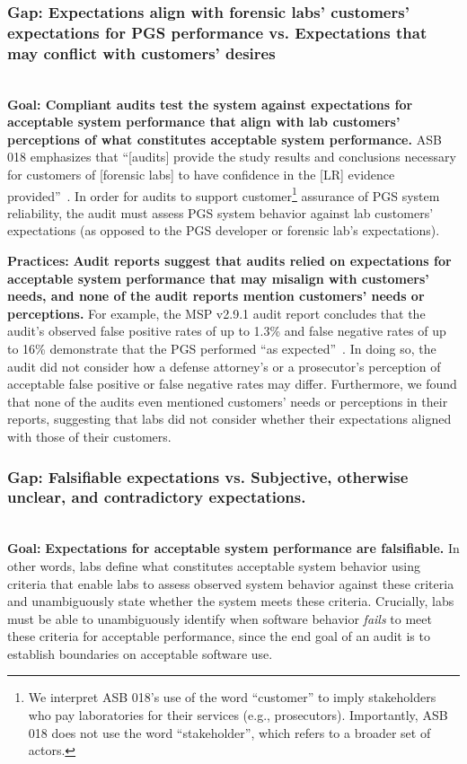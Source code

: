 \subsubsection{Gap: Expectations align with forensic labs' customers' expectations for PGS performance vs. Expectations that may conflict with customers' desires}
\label{sec:stds-gap2}
\textbf{\\Goal: Compliant audits test the system against expectations for acceptable system performance that align with lab customers' perceptions of what constitutes acceptable system performance.} ASB 018 emphasizes that ``[audits] provide the study results and conclusions necessary for customers of [forensic labs] to have confidence in the [LR] evidence provided''~\cite[Foreword]{asb018}. In order for audits to support customer\footnote{We interpret ASB 018's use of the word ``customer'' to imply stakeholders who pay laboratories for their services (e.g., prosecutors). Importantly, ASB 018 does not use the word ``stakeholder'', which refers to a broader set of actors.} assurance of PGS system reliability, the audit must assess PGS system behavior against lab customers'  expectations (as opposed to the PGS developer or forensic lab's expectations).


\textbf{Practices:} \textbf{Audit reports suggest that audits relied on expectations for acceptable system performance that may misalign with customers' needs, and none of the audit reports mention customers' needs or perceptions.} For example, the MSP v2.9.1 audit report concludes that the audit's observed false positive rates of up to 1.3\% and false negative rates of up to 16\% demonstrate that the PGS performed ``as expected''~\cite[p.27]{mspIV}. In doing so, the audit did not consider how a defense attorney's or a prosecutor's perception of acceptable false positive or false negative rates may differ. Furthermore, we found that none of the audits even mentioned customers' needs or perceptions in their reports, suggesting that labs did not consider whether their expectations aligned with those of their customers.


\subsubsection{Gap: Falsifiable expectations vs. Subjective, otherwise unclear, and contradictory expectations.}
\label{sec:stds-gap3}
\textbf{\\Goal: } \textbf{Expectations for acceptable system performance are falsifiable.} In other words, labs define what constitutes acceptable system behavior using criteria that enable labs to assess observed system behavior against these criteria and unambiguously state whether the system meets these criteria. Crucially, labs must be able to unambiguously identify when software behavior \textit{fails} to meet these criteria for acceptable performance, since the end goal of an audit is to establish boundaries on acceptable software use.


